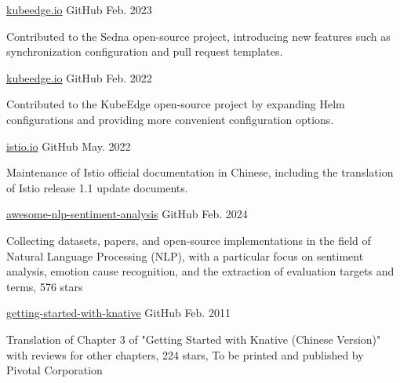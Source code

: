 \begin{cventries}
    \cventry
    {} %
    {\href{https://github.com/kubeedge/sedna}{kubeedge.io}} %
    {GitHub} %
    {Feb. 2023} %
    {
      \begin{cvitems} %
        \item Contributed to the Sedna open-source project, introducing new features such as synchronization configuration and pull request templates.
      \end{cvitems}
    }

    \cventry
    {} %
    {\href{https://github.com/kubeedge/kubeedge}{kubeedge.io}} %
    {GitHub} %
    {Feb. 2022} %
    {
      \begin{cvitems} %
        \item Contributed to the KubeEdge open-source project by expanding Helm configurations and providing more convenient configuration options.
      \end{cvitems}
    }

  \cventry
    {} %
    {\href{https://github.com/istio/istio.io}{istio.io}} %
    {GitHub} %
    {May. 2022} %
    {
      \begin{cvitems} %
        \item Maintenance of Istio official documentation in Chinese, including the translation of Istio release 1.1 update documents.
      \end{cvitems}
    }

  \cventry
    {} %
    {\href{https://github.com/haiker2011/awesome-nlp-sentiment-analysis}{awesome-nlp-sentiment-analysis}} %
    {GitHub} %
    {Feb. 2024} %
    {
      \begin{cvitems} %
        \item Collecting datasets, papers, and open-source implementations in the field of Natural Language Processing (NLP), with a particular focus on sentiment analysis, emotion cause recognition, and the extraction of evaluation targets and terms, 576 stars
      \end{cvitems}
    }

  \cventry
    {} %
    {\href{https://github.com/servicemesher/getting-started-with-knative}{getting-started-with-knative}} %
    {GitHub} %
    {Feb. 2011} %
    {
      \begin{cvitems} %
        \item Translation of Chapter 3 of "Getting Started with Knative (Chinese Version)" with reviews for other chapters, 224 stars, To be printed and published by Pivotal Corporation
      \end{cvitems}
    }

\end{cventries}